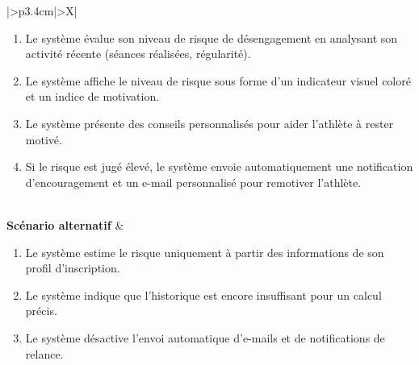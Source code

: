 \documentclass[a4paper,12pt]{report}
\begin{document}
\begin{table}[H]
\begin{tabularx}{\textwidth}{|>{\RaggedRight\arraybackslash}p{3.4cm}|>{\RaggedRight\arraybackslash}X|}
\begin{minipage}[t]{\linewidth}
\begin{enumerate}[label=\arabic*., leftmargin=*, topsep=0pt, itemsep=1pt]
    \item Le système évalue son niveau de risque de désengagement en analysant son activité récente (séances réalisées, régularité).
    \item Le système affiche le niveau de risque sous forme d'un indicateur visuel coloré et un indice de motivation.
    \item Le système présente des conseils personnalisés pour aider l'athlète à rester motivé.
    \item Si le risque est jugé élevé, le système envoie automatiquement une notification d'encouragement et un e-mail personnalisé pour remotiver l'athlète.
\end{enumerate}
\vspace{2pt}
\end{minipage} \\
\hline
\textbf{Scénario alternatif } &
\begin{minipage}[t]{\linewidth}
\vspace{2pt}

\begin{enumerate}[label=\arabic*., leftmargin=*, topsep=2pt, itemsep=1pt]
    \item Le système estime le risque uniquement à partir des informations de son profil d'inscription.
    \item Le système indique que l'historique est encore insuffisant pour un calcul précis.
    \item Le système désactive l'envoi automatique d'e-mails et de notifications de relance.
\end{enumerate}
\vspace{2pt}
\end{minipage} \\
\hline
\end{tabularx}
\fussy
\end{table}
\end{document}
